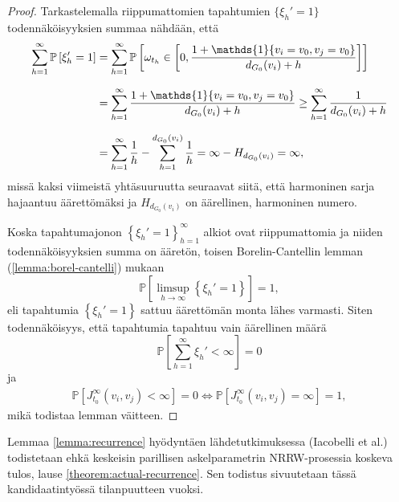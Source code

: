 \documentclass[finnish, 12pt, a4paper, sci, utf8, pdfa]{aaltothesis}
\newcommand{\indicator}{\mathopen{\mathds{1}}}
\newcommand*{\prob}{\mathbb{P}}
\begin{document}
\begin{proof}
   Tarkastelemalla riippumattomien tapahtumien $ \{ \xi_{h}' = 1 \} $ todennäköisyyksien summaa nähdään, että
   \begin{equation*}
      \setlength{\jot}{10pt}
      \begin{aligned}
      \sum_{h = 1}^{\infty} \prob \left[ \xi_{h}' = 1 \right] &= \sum_{h = 1}^{\infty} \prob \left[ \omega_{t_{h}} \in \left[ 0, \frac{1 + \indicator \{ v_{i} = v_{0}, v_{j} = v_{0} \}}{d_{G_{0}}(v_{i}) + h} \right] \right] \\
         &= \sum_{h = 1}^{\infty} \frac{1 + \indicator \left\{ v_{i} = v_{0}, v_{j} = v_{0} \right\}}{d_{G_{0}}(v_{i}) + h} \geq \sum_{h = 1}^{\infty} \frac{1}{d_{G_{0}}(v_{i}) + h} \\
         &= \sum_{h = 1}^{\infty} \frac{1}{h} - \sum_{h = 1}^{d_{G_{0}}(v_{i})} \frac{1}{h} = \infty - H_{d_{G_{0}}(v_{i})} = \infty,
      \end{aligned}
   \end{equation*}
   missä kaksi viimeistä yhtäsuuruutta seuraavat siitä, että harmoninen sarja hajaantuu äärettömäksi ja $ H_{d_{G_{0}}(v_{i})} $ on äärellinen, harmoninen numero.

   Koska tapahtumajonon $ \left\{ \xi_{h}' = 1 \right\}_{h = 1}^{\infty} $ alkiot ovat riippumattomia ja niiden todennäköisyyksien summa on ääretön, toisen Borelin-Cantellin lemman 
   (\ref{lemma:borel-cantelli}) mukaan
   \begin{equation*}
      \prob \left[ \limsup \limits_{h \rightarrow \infty} \left\{ \xi_{h}' = 1 \right\} \right] = 1,
   \end{equation*}
   eli tapahtumia $ \left\{ \xi_{h}' = 1 \right\} $ sattuu äärettömän monta lähes varmasti. Siten todennäköisyys, että tapahtumia tapahtuu vain äärellinen määrä
   \begin{equation*}
      \prob \left[ \sum_{h = 1}^{\infty} \xi_{h}' < \infty \right] = 0
   \end{equation*}
   ja
   \begin{align*}
      \prob \left[ J_{t_{0}}^{\infty}(v_{i}, v_{j}) < \infty \right] = 0 \Leftrightarrow \prob \left[ J_{t_{0}}^{\infty}(v_{i}, v_{j}) = \infty \right] = 1,
   \end{align*}
   mikä todistaa lemman väitteen.
\end{proof}

Lemmaa \ref{lemma:recurrence} hyödyntäen lähdetutkimuksessa (Iacobelli et al.) todistetaan ehkä keskeisin parillisen askelparametrin NRRW-prosessia koskeva tulos, lause \ref{theorem:actual-recurrence}. Sen todistus sivuutetaan tässä kandidaatintyössä tilanpuutteen vuoksi. \cite{Iacobelli}
\end{document}
